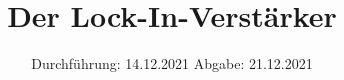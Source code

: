 

\subject{V303}
\title{Der Lock-In-Verstärker}
\date{%
  Durchführung: 14.12.2021
  \hspace{3em}
  Abgabe: 21.12.2021
}



\maketitle
\thispagestyle{empty}
\tableofcontents
\newpage






\printbibliography{}


